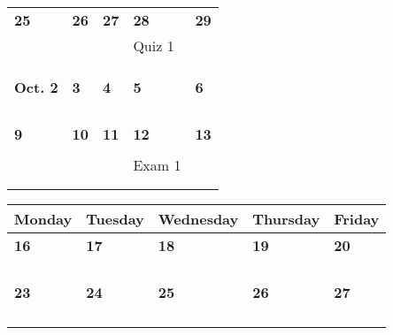 \documentclass[letter, 12pt]{article}
\begin{document}
\begin{center}
\begin{tabular}{|l|l|l|l|l|}

\textbf{25} & \textbf{26} & \textbf{27} & \textbf{28} & \textbf{29} \\
&  &  &  Quiz 1& \\
%
&  &  &  & \\
%
&  &  &  & \\
%
&  &  &  & \\
\hline



\textbf{Oct. 2} & \textbf{3} & \textbf{4} & \textbf{5} & \textbf{6} \\
&  &  &  & \\
%
&  &  &  & \\
%
&  &  &  & \\
%
&  &  &  & \\
\hline

\textbf{9} & \textbf{10} & \textbf{11} & \textbf{12} & \textbf{13} \\
&  &  &  & \\
%
&  &  & Exam 1 & \\
%
&  &  &  & \\
%
&  &  &  & \\
\hline
\end{tabular}
\begin{tabular}{|l|l|l|l|l|}
\hline
{\bf \phantom{xx}Monday\phantom{x}}
 & {\bf \phantom{xx}Tuesday\phantom{x}}
 & {\bf \phantom{x}Wednesday\phantom{}}
 & {\bf \phantom{x}Thursday\phantom{x}}
 & {\bf \phantom{xx}Friday\phantom{xx}} \\
\hline

\textbf{16} & \textbf{17} & \textbf{18} & \textbf{19} & \textbf{20} \\
&  &  &  & \\
%
&  &  &  & \\
%
&  &  &  & \\
%
&  &  &  & \\
\hline

\textbf{23} & \textbf{24} & \textbf{25} & \textbf{26} & \textbf{27} \\
& &  &  & \\
%
&  &  &  & \\
%
&  &  &  & \\
%
&  &  &  & \\
\hline


\end{tabular}
\end{center}
\end{document}
